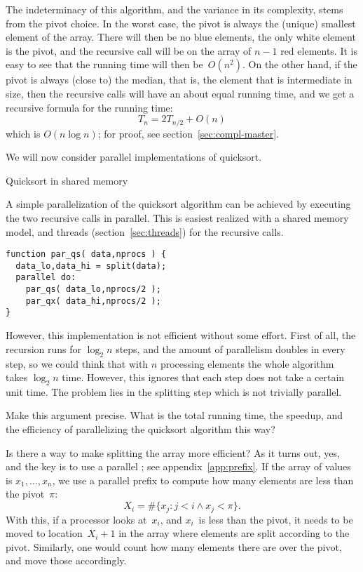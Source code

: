 The indeterminacy of this algorithm, and the variance in its
complexity, stems from the pivot choice. In the worst case, the pivot
is always the (unique) smallest element of the array. There will then
be no blue elements, the only white element is the pivot, and the
recursive call will be on the array of $n-1$ red elements. It is easy
to see that the running time will then be~$O(n^2)$. On the other hand,
if the pivot is always (close to) the median, that is, the element
that is intermediate in size, then the recursive calls will have an
about equal running time, and we get a recursive formula for the
running time:
\[ T_n = 2T_{n/2} + O(n) \]
which  is $O(n\log n)$;
for proof, see section~\ref{sec:compl-master}.

We will now consider parallel implementations of quicksort.

 {Quicksort in shared memory}

A simple parallelization of the quicksort algorithm can be achieved by
executing the two recursive calls in parallel. This is easiest
realized with a shared memory model, and threads
(section~\ref{sec:threads}) for the recursive calls.

\begin{verbatim}
function par_qs( data,nprocs ) {
  data_lo,data_hi = split(data);
  parallel do:
    par_qs( data_lo,nprocs/2 );
    par_qx( data_hi,nprocs/2 );
}
\end{verbatim}

However, this implementation is not efficient without some effort.
First of all, the recursion runs for $\log_2 n$ steps,
and the amount of parallelism doubles in every step,
so we could think that with $n$ processing elements
the whole algorithm takes $\log_2 n$ time.
However, this ignores that each step does not take a certain unit time.
The problem lies in the splitting step which is not trivially parallel.

\begin{exercise}
  Make this argument precise. What is the total running time, the
  speedup, and the efficiency of parallelizing the quicksort algorithm
  this way?
\end{exercise}

Is there a way to make splitting the array more efficient?
As it turns out, yes, and the key is to use a parallel
; see appendix~\ref{app:prefix}.
If the array of values
is $x_1,\ldots,x_n$, we use a parallel prefix to compute
how many elements are less than the pivot~$\pi$:
\[ X_i=\#\{ x_j\colon j<i\wedge x_j<\pi \}. \]
With this, if a processor looks at~$x_i$, and $x_i$~is less
than the pivot, it needs to be moved to location~$X_i+1$
in the array where elements are split according to the pivot.
%
Similarly, one would count how many elements there are over the pivot,
and move those accordingly.

